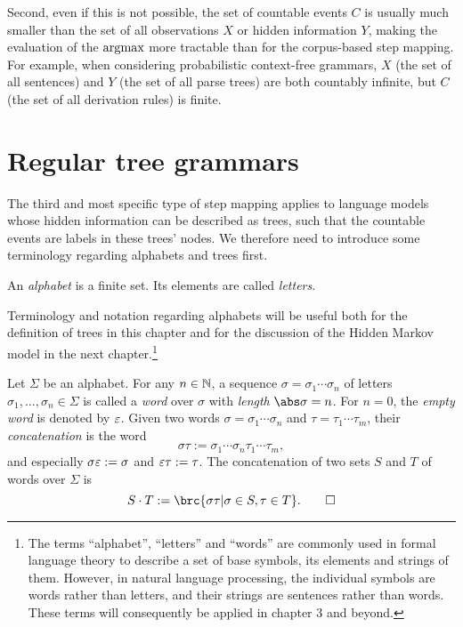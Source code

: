 Second, even if this is not possible, the set of countable events $C$ is
usually much smaller than the set of all observations $X$ or hidden information
$Y$, making the evaluation of the $\argmax$ more tractable than for the
corpus-based step mapping. For example, when considering probabilistic
context-free grammars, $X$ (the set of all sentences) and $Y$ (the set of all
parse trees) are both countably infinite, but $C$ (the set of all derivation
rules) is finite.

\section{Regular tree grammars}

The third and most specific type of step mapping applies to language models
whose hidden information can be described as trees, such that the countable
events are labels in these trees' nodes. We therefore need to introduce some
terminology regarding alphabets and trees first.

\begin{definition}
 An \emph{alphabet} is a finite set. Its elements are called \emph{letters}.
\end{definition}

Terminology and notation regarding alphabets will be useful both for the
definition of trees in this chapter and for the discussion of the Hidden Markov
model in the next chapter.\footnote{The terms ``alphabet'', ``letters'' and
``words'' are commonly used in formal language theory to describe a set of base
symbols, its elements and strings of them. However, in natural language
processing, the individual symbols are words rather than letters, and their
strings are sentences rather than words. These terms will consequently be
applied in chapter 3 and beyond.}

\begin{definition}
 Let $\Sigma$ be an alphabet. For any $n\in\mathbb N$, a sequence $\sigma =
 \sigma_1\cdots\sigma_n$ of letters $\sigma_1,\ldots,\sigma_n\in\Sigma$ is
 called a \emph{word} over $\sigma$ with \emph{length} $\abs\sigma = n$. For
 $n=0$, the \emph{empty word} is denoted by $\varepsilon$. Given two words
 $\sigma=\sigma_1\cdots\sigma_n$ and $\tau=\tau_1\cdots\tau_m$, their
 \emph{concatenation} is the word
 \[
  \sigma\tau := \sigma_1\cdots\sigma_n\tau_1\cdots\tau_m,
 \]
 and especially $\sigma\varepsilon := \sigma$ and $\varepsilon\tau := \tau$. The
 concatenation of two sets $S$ and $T$ of words over $\Sigma$ is
 \[
  S\cdot T := \brc{\sigma\tau|\sigma\in S, \tau\in T}.\qedhere
 \]
\end{definition}


